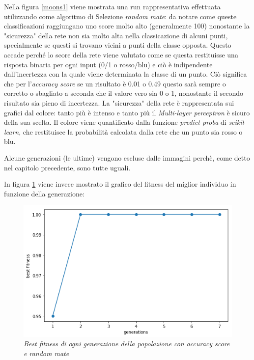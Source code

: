 \documentclass[12pt,a4paper]{report}
\begin{document}
Nella figura \ref{moons1} viene mostrata una run rappresentativa effettuata utilizzando come algoritmo di Selezione \textit{random mate}: da notare come queste classificazioni raggiungano uno score molto alto (generalmente 100\textdiscount) nonostante la "sicurezza" della rete non sia molto alta nella classicazione di alcuni punti, specialmente se questi si trovano vicini a punti della classe opposta.
Questo accade perché lo score della rete viene valutato come se questa restituisse una risposta binaria per ogni input (0/1 o rosso/blu) e ciò è indipendente dall'incertezza con la quale viene determinata la classe di un punto. 
Ciò significa che per l'\textit{accuracy score} se un risultato è 0.01 o 0.49 questo sarà sempre o corretto o sbagliato a seconda che il valore vero sia 0 o 1, nonostante il secondo risultato sia pieno di incertezza.  
La "sicurezza" della rete è rappresentata sui grafici dal colore: tanto più è intenso e tanto  più il \textit{Multi-layer perceptron} è sicuro della sua scelta.
Il colore viene quantificato dalla funzione \textit{predict proba} di \textit{scikit learn}, che restituisce la probabilità calcolata dalla rete che un punto sia rosso o blu.

Alcune generazioni (le ultime) vengono escluse dalle immagini perchè, come detto nel capitolo precedente, sono tutte uguali.

In figura \ref{best1} viene invece mostrato il grafico del fitness del miglior individuo in funzione della generazione:

\begin{figure}[H]
 \centering
 \includegraphics[scale = 0.5]{images/moons-rnd-acc./best}
 \caption{\textit{Best fitness di ogni generazione della popolazione con accuracy score e random mate}}
 \label{best1}
\end{figure}
\end{document}
